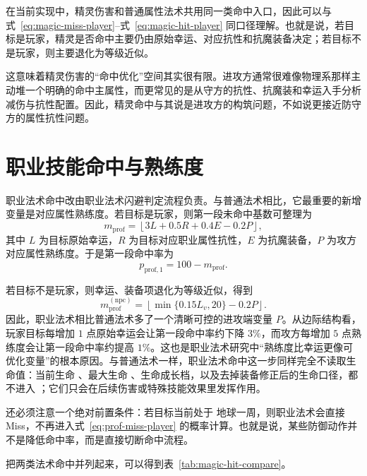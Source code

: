 在当前实现中，精灵伤害和普通属性法术共用同一类命中入口，因此可以与式~\eqref{eq:magic-miss-player}--式~\eqref{eq:magic-hit-player} 同口径理解。也就是说，若目标是玩家，精灵是否命中主要仍由原始幸运、对应抗性和抗魔装备决定；若目标不是玩家，则主要退化为等级近似。

这意味着精灵伤害的“命中优化”空间其实很有限。进攻方通常很难像物理系那样主动堆一个明确的命中主属性，而更常见的是从守方的抗性、抗魔装和幸运入手分析减伤与抗性配置。因此，精灵命中与其说是进攻方的构筑问题，不如说更接近防守方的属性抗性问题。

\section{职业技能命中与熟练度}

职业法术命中改由职业法术闪避判定流程负责。与普通法术相比，它最重要的新增变量是对应属性熟练度。若目标是玩家，则第一段未命中基数可整理为
\begin{equation}
    m_{\mathrm{prof}}
    = \left\lfloor 3L + 0.5R + 0.4E - 0.2P \right\rfloor,
    \label{eq:prof-miss-player}
\end{equation}
其中 $L$ 为目标原始幸运，$R$ 为目标对应职业属性抗性，$E$ 为抗魔装备，$P$ 为攻方对应属性熟练度。于是第一段命中率为
\begin{equation}
    p_{\mathrm{prof},1}=100-m_{\mathrm{prof}}.
    \label{eq:prof-hit-stage1}
\end{equation}

若目标不是玩家，则幸运、装备项退化为等级近似，得到
\begin{equation}
    m_{\mathrm{prof}}^{(\mathrm{npc})}
    = \left\lfloor \min\{0.15L_v,20\} - 0.2P \right\rfloor.
\end{equation}
因此，职业法术相比普通法术多了一个清晰可控的进攻端变量 $P$。从边际结构看，玩家目标每增加 $1$ 点原始幸运会让第一段命中率约下降 $3\%$，而攻方每增加 $5$ 点熟练度会让第一段命中率约提高 $1\%$。这也是职业法术研究中“熟练度比幸运更像可优化变量”的根本原因。与普通法术一样，职业法术命中这一步同样完全不读取生命值：当前生命 、最大生命 、生命成长档，以及去掉装备修正后的生命口径，都不进入 ；它们只会在后续伤害或特殊技能效果里发挥作用。

还必须注意一个绝对前置条件：若目标当前处于 地球一周，则职业法术会直接 Miss，不再进入式~\eqref{eq:prof-miss-player} 的概率计算。也就是说，某些防御动作并不是降低命中率，而是直接切断命中流程。

把两类法术命中并列起来，可以得到表~\ref{tab:magic-hit-compare}。

